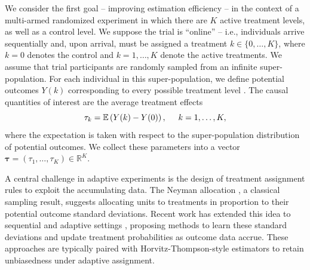 \documentclass{article}
\newcommand{\bstau}{\boldsymbol \tau}
\def\E{\mathbb{E}}
\begin{document}

We consider the first goal -- improving estimation efficiency -- in the context of a multi-armed randomized experiment in which there are $K$ active treatment levels, as well as a control level. We suppose the trial is ``online'' -- i.e., individuals arrive sequentially and, upon arrival, must be assigned a treatment $k \in \{0, \dots, K\}$, where $k = 0$ denotes the control and $k = 1, \dots, K$ denote the active treatments. We assume that trial participants are randomly sampled from an infinite super-population.
For each individual in this super-population, we define potential outcomes $Y(k)$ corresponding to every possible treatment level \citep{rubin1974estimating}. The causal quantities of interest are the average treatment effects
\[
\tau_k = \E\left( Y(k) - Y(0) \right), \hspace{5mm} k = 1, \dots, K,
\]
where the expectation is taken with respect to the super-population distribution of potential outcomes.
We collect these parameters into a vector $\bstau = (\tau_1, \dots, \tau_K) \in \mathbb{R}^K$.

A central challenge in adaptive experiments is the design of treatment assignment rules to exploit the accumulating data. The Neyman allocation \citep{Neyman1934}, a classical sampling result, suggests allocating units to treatments in proportion to their potential outcome standard deviations. Recent work has extended this idea to sequential and adaptive settings \citep{dai2023clip, zhao2023adaptive, chen2025sigmoid}, proposing methods to learn these standard deviations and update 
treatment probabilities as outcome data accrue. These approaches are typically paired with Horvitz-Thompson-style estimators to retain unbiasedness under adaptive assignment.

\end{document}
